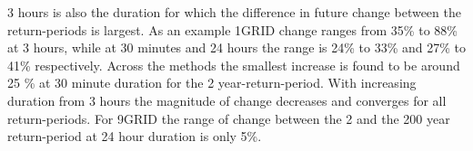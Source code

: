 3 hours is also the duration for which the difference in future change between the return-periods is largest. As an example 1GRID change ranges from 35\% to 88\% at 3 hours, while at 30 minutes and 24 hours the range is 24\% to 33\% and 27\% to 41\% respectively. Across the methods the smallest increase is found to be around 25 \% at 30 minute duration for the 2 year-return-period. With increasing duration from 3 hours the magnitude of change decreases and converges for all return-periods. For 9GRID the range of change between the 2 and the 200 year return-period at 24 hour duration is only 5\%. 
